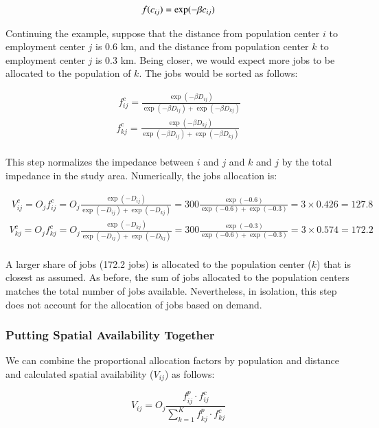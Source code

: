 \documentclass[]{elsarticle} %
\begin{document}
\[
f(c_{ij}) = \exp(-\beta c_{ij})\\
\]

Continuing the example, suppose that the distance from population center
\(i\) to employment center \(j\) is 0.6 km, and the distance from
population center \(k\) to employment center \(j\) is 0.3 km. Being
closer, we would expect more jobs to be allocated to the population of
\(k\). The jobs would be sorted as follows:

\[
\begin{array}{l}\
f^c_{ij} = \frac{\exp(-\beta D_{ij})}{\exp(-\beta D_{ij}) + \exp(-\beta D_{kj})}\\
f^c_{kj} = \frac{\exp(-\beta D_{kj})}{\exp(-\beta D_{ij}) + \exp(-\beta D_{kj})}\\
\end{array}
\]

This step normalizes the impedance between \(i\) and \(j\) and \(k\) and
\(j\) by the total impedance in the study area. Numerically, the jobs
allocation is:

\[
\begin{array}{l}\
V^c_{ij} = O_jf^c_{ij} = O_j\frac{\exp(-D_{ij})}{\exp(-D_{ij}) + \exp(-D_{kj})} = 300\frac{\exp(-0.6)}{\exp(-0.6) + \exp(-0.3)} = 3\times 0.426 = 127.8\\
V^c_{kj} = O_jf^c_{kj} =  O_j\frac{\exp(-D_{kj})}{\exp(-D_{ij}) + \exp(-D_{kj})} = 300\frac{\exp(-0.3)}{\exp(-0.6) + \exp(-0.3)} = 3\times  0.574 = 172.2\\
\end{array}
\]

A larger share of jobs (172.2 jobs) is allocated to the population
center (\(k\)) that is closest as assumed. As before, the sum of jobs
allocated to the population centers matches the total number of jobs
available. Nevertheless, in isolation, this step does not account for
the allocation of jobs based on demand.

\hypertarget{putting-spatial-availability-together}{%
\subsubsection{Putting Spatial Availability
Together}\label{putting-spatial-availability-together}}

We can combine the proportional allocation factors by population and
distance and calculated spatial availability (\(V_{ij}\)) as follows:

\[
V_{ij} = O_j\frac{f^p_{ij} \cdot f^c_{ij}}{\sum_{k=1}^K f^p_{kj} \cdot f^c_{kj}}
\]
\end{document}

